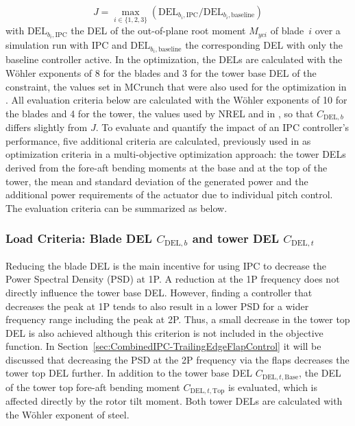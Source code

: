 \begin{equation} \label{eq:costFunIPC}
    J = \max_{i \in \{1,2,3\}} \left(\text{DEL}_{b_i,\text{IPC}}/\text{DEL}_{b_i,\text{baseline}}\right)
\end{equation} %
with $\text{DEL}_{b_i,\text{IPC}}$ the DEL of the out-of-plane root moment $M_{yci}$ of blade~$i$ over a simulation run with IPC and $\text{DEL}_{b_i,\text{baseline}}$ the corresponding DEL with only the baseline controller active. In the optimization, the DELs are calculated with the W\"ohler exponents of 8 for the blades and 3 for the tower base DEL of the constraint, the values set in MCrunch that were also used for the optimization in \cite{dittmer2024combined}. All evaluation criteria below are calculated with the W\"ohler exponents of 10 for the blades and 4 for the tower, the values used by NREL and in \cite{hoffmann2018load}, so that $C_{\text{DEL},b}$ differs slightly from $J$.
To evaluate and quantify the impact of an IPC controller's performance, five additional criteria are calculated, previously used in \cite{hoffmann2018load} as optimization criteria in a multi-objective optimization approach: the tower DELs derived from the fore-aft bending moments at the base and at the top of the tower, the mean and standard deviation of the generated power and the additional power requirements of the actuator due to individual pitch control. The evaluation criteria can be summarized as below.

\subsubsection*{Load Criteria: Blade DEL $C_{\text{DEL},b}$ and tower DEL $C_{\text{DEL},t}$}
Reducing the blade DEL is the main incentive for using IPC to decrease the Power Spectral Density (PSD) at 1P. A reduction at the 1P frequency does not directly influence the tower base DEL. However, finding a controller that decreases the peak at 1P tends to also result in a lower PSD for a wider frequency range including the peak at 2P. Thus, a small decrease in the tower top DEL is also achieved although this criterion is not included in the objective function. In Section~\ref{sec:CombinedIPC-TrailingEdgeFlapControl} it will be discussed that decreasing the PSD at the 2P frequency via the flaps decreases the tower top DEL further. In addition to the tower base DEL $C_{\text{DEL},t,\text{Base}}$, the DEL of the tower top fore-aft bending moment $C_{\text{DEL},t,\text{Top}}$ is evaluated, which is affected directly by the rotor tilt moment. Both tower DELs are calculated with the Wöhler exponent of steel. 

